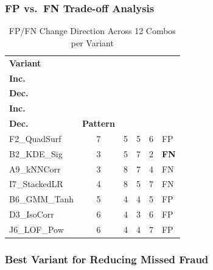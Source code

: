 \documentclass[journal]{IEEEtran}
\begin{document}
\subsubsection{FP vs.\ FN Trade-off Analysis}

\begin{table}[!t]
\centering
\caption{FP/FN Change Direction Across 12 Combos per Variant}
\label{tab:fpfn_tradeoff}
\setlength{\tabcolsep}{3pt}
\begin{tabular}{@{}lccccl@{}}
\toprule
\textbf{Variant} & \makecell{\textbf{FP}\\\textbf{Inc.}} & \makecell{\textbf{FP}\\\textbf{Dec.}} & \makecell{\textbf{FN}\\\textbf{Inc.}} & \makecell{\textbf{FN}\\\textbf{Dec.}} & \textbf{Pattern} \\
\midrule
F2\_QuadSurf     & 7 & 5 & 5 & 6 & FP \\
B2\_KDE\_Sig     & 3 & 5 & 7 & 2 & \textbf{FN} \\
A9\_kNNCorr      & 3 & 8 & 7 & 4 & FN \\
I7\_StackedLR    & 4 & 8 & 5 & 7 & FN \\
B6\_GMM\_Tanh    & 5 & 4 & 4 & 5 & FP \\
D3\_IsoCorr      & 6 & 4 & 3 & 6 & FP \\
J6\_LOF\_Pow     & 6 & 4 & 4 & 7 & FP \\
\bottomrule
\end{tabular}
\end{table}

\subsubsection{Best Variant for Reducing Missed Fraud}
\end{document}
